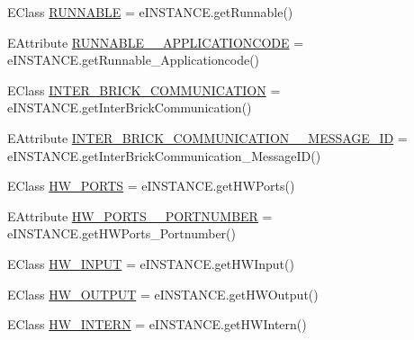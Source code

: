 \begin{DoxyCompactItemize}
\item 
E\-Class \hyperlink{interfaceshootingmachineemfmodel_1_1_shootingmachineemfmodel_package_1_1_literals_adc1820eccabf58b14ef224032dd51498}{R\-U\-N\-N\-A\-B\-L\-E} = e\-I\-N\-S\-T\-A\-N\-C\-E.\-get\-Runnable()
\item 
E\-Attribute \hyperlink{interfaceshootingmachineemfmodel_1_1_shootingmachineemfmodel_package_1_1_literals_adc064ca355e28e0852dc372bece4a75c}{R\-U\-N\-N\-A\-B\-L\-E\-\_\-\-\_\-\-A\-P\-P\-L\-I\-C\-A\-T\-I\-O\-N\-C\-O\-D\-E} = e\-I\-N\-S\-T\-A\-N\-C\-E.\-get\-Runnable\-\_\-\-Applicationcode()
\item 
E\-Class \hyperlink{interfaceshootingmachineemfmodel_1_1_shootingmachineemfmodel_package_1_1_literals_a9744d5c3be118507d7e7c661b7882d4e}{I\-N\-T\-E\-R\-\_\-\-B\-R\-I\-C\-K\-\_\-\-C\-O\-M\-M\-U\-N\-I\-C\-A\-T\-I\-O\-N} = e\-I\-N\-S\-T\-A\-N\-C\-E.\-get\-Inter\-Brick\-Communication()
\item 
E\-Attribute \hyperlink{interfaceshootingmachineemfmodel_1_1_shootingmachineemfmodel_package_1_1_literals_a7f8c5b876efa409144b3f78f77678e1a}{I\-N\-T\-E\-R\-\_\-\-B\-R\-I\-C\-K\-\_\-\-C\-O\-M\-M\-U\-N\-I\-C\-A\-T\-I\-O\-N\-\_\-\-\_\-\-M\-E\-S\-S\-A\-G\-E\-\_\-\-I\-D} = e\-I\-N\-S\-T\-A\-N\-C\-E.\-get\-Inter\-Brick\-Communication\-\_\-\-Message\-I\-D()
\item 
E\-Class \hyperlink{interfaceshootingmachineemfmodel_1_1_shootingmachineemfmodel_package_1_1_literals_a240205c41ebf9293870a8a32fb0650c1}{H\-W\-\_\-\-P\-O\-R\-T\-S} = e\-I\-N\-S\-T\-A\-N\-C\-E.\-get\-H\-W\-Ports()
\item 
E\-Attribute \hyperlink{interfaceshootingmachineemfmodel_1_1_shootingmachineemfmodel_package_1_1_literals_a955807dd50799b8ae1cef72c95a2b854}{H\-W\-\_\-\-P\-O\-R\-T\-S\-\_\-\-\_\-\-P\-O\-R\-T\-N\-U\-M\-B\-E\-R} = e\-I\-N\-S\-T\-A\-N\-C\-E.\-get\-H\-W\-Ports\-\_\-\-Portnumber()
\item 
E\-Class \hyperlink{interfaceshootingmachineemfmodel_1_1_shootingmachineemfmodel_package_1_1_literals_a6e76f89e5af98b966439f2e0f19b6fc1}{H\-W\-\_\-\-I\-N\-P\-U\-T} = e\-I\-N\-S\-T\-A\-N\-C\-E.\-get\-H\-W\-Input()
\item 
E\-Class \hyperlink{interfaceshootingmachineemfmodel_1_1_shootingmachineemfmodel_package_1_1_literals_ae96d4be80e17f106f86c757095eb815a}{H\-W\-\_\-\-O\-U\-T\-P\-U\-T} = e\-I\-N\-S\-T\-A\-N\-C\-E.\-get\-H\-W\-Output()
\item 
E\-Class \hyperlink{interfaceshootingmachineemfmodel_1_1_shootingmachineemfmodel_package_1_1_literals_acb4d8b46ec5fe9a6ed9d4159335d3ce7}{H\-W\-\_\-\-I\-N\-T\-E\-R\-N} = e\-I\-N\-S\-T\-A\-N\-C\-E.\-get\-H\-W\-Intern()

\end{DoxyCompactItemize}
